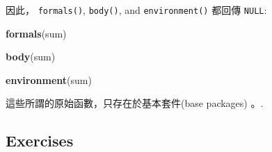 \documentclass[]{book}
\newenvironment{Shaded}{\begin{snugshade}}{\end{snugshade}}
\newcommand{\KeywordTok}[1]{\textcolor[rgb]{0.13,0.29,0.53}{\textbf{#1}}}
\newcommand{\NormalTok}[1]{#1}
\theoremstyle{definition}
\theoremstyle{definition}
\theoremstyle{definition}
\theoremstyle{remark}
\begin{document}
因此， \texttt{formals()}, \texttt{body()}, and \texttt{environment()}
都回傳 \texttt{NULL}:

\begin{Shaded}
\begin{Highlighting}[]
\KeywordTok{formals}\NormalTok{(sum)}
\end{Highlighting}
\end{Shaded}

\begin{Shaded}
\begin{Highlighting}[]
\KeywordTok{body}\NormalTok{(sum)}
\end{Highlighting}
\end{Shaded}

\begin{Shaded}
\begin{Highlighting}[]
\KeywordTok{environment}\NormalTok{(sum)}
\end{Highlighting}
\end{Shaded}

這些所謂的原始函數，只存在於基本套件(base packages) 。.

\subsection{Exercises}\label{exercises}
\end{document}
